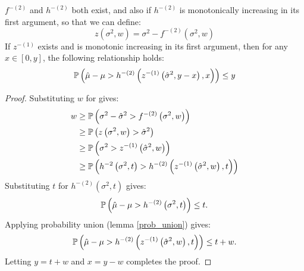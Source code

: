 \begin{theorem}\label{ebb1} 
\DIFdelbegin {}\DIFdelend \DIFaddbegin {}\DIFaddend $f^{-(2)}$ and $h^{-(2)}$ both exist, and also if $h^{-(2)}$ is monotonically increasing in its first argument, so that we can define:
\[
z(\sigma^2,w) = \sigma^2-f^{-(2)}\left(\sigma^2,w\right)
\]
If $z^{-(1)}$ exists and is monotonic increasing in its first argument, then for any $x\in[0,y]$, the following relationship holds:
\[
\operatorname{\mathbb{P}}\left(\hat{\mu}-\mu>h^{-(2)}\left(z^{-(1)}\left(\hat{\sigma}^2,y-x\right),x\right)\right)
\le y
\]
\end{theorem}
%
\begin{proof}
Substituting $w$ for \DIFdelbegin {}\DIFdelend \DIFaddbegin {}\DIFaddend gives:
\begin{align*}
w & \ge \operatorname{\mathbb{P}}\left(\sigma^2-\hat{\sigma}^2>f^{-(2)}\left(\sigma^2,w\right)\right)\\
 & \ge \operatorname{\mathbb{P}}\left(z\left(\sigma^2,w\right)>\hat{\sigma}^2\right)\\
 & \ge \operatorname{\mathbb{P}}\left(\sigma^2>z^{-(1)}\left(\hat{\sigma}^2,w\right)\right)\\
 & \ge \operatorname{\mathbb{P}}\left(h^{-2}\left(\sigma^2,t\right)>h^{-(2)}\left(z^{-(1)}\left(\hat{\sigma}^2,w\right),t\right)\right)
\end{align*}
Substituting $t$ for $h^{-(2)}(\sigma^2,t)$ gives:
\[
\operatorname{\mathbb{P}}\left(\hat{\mu}-\mu>h^{-(2)}\left(\sigma^2,t\right)\right)
\le t.
\]
Applying probability union (lemma \ref{prob_union}) gives:\\
\[
\operatorname{\mathbb{P}}\left(\hat{\mu}-\mu>h^{-(2)}\left(z^{-(1)}\left(\hat{\sigma}^2,w\right),t\right)\right)
\le t+w.
\]
Letting $y=t+w$ and $x=y-w$ completes the proof.
\end{proof}

